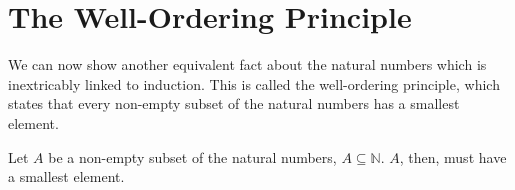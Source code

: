 \documentclass[twoside]{report}
\begin{document}

\section{The Well-Ordering Principle}

We can now show another equivalent fact about the natural numbers which is inextricably linked to induction. This is called the well-ordering principle, which states that every non-empty subset of the natural numbers has a smallest element.

\vspace{\baselineskip}
\begin{theorem}
	Let $A$ be a non-empty subset of the natural numbers, $A \subseteq \mathbb{N}$. $A$, then, must have a smallest element.
\end{theorem}
\end{document}
